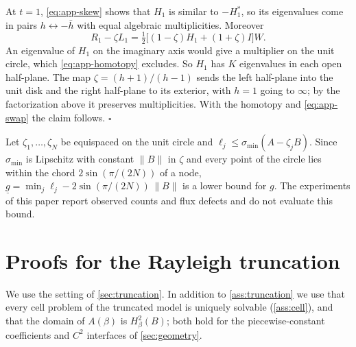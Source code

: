 At $t=1$, \eqref{eq:app-skew} shows that $H_1$ is similar to $-H_1^*$, so its
eigenvalues come in pairs $h\leftrightarrow-\bar h$ with equal algebraic
multiplicities. Moreover
\[
  R_1-\zeta L_1=\tfrac12\bigl[(1-\zeta)H_1+(1+\zeta)I\bigr]W .
\]
An eigenvalue of $H_1$ on the imaginary axis would give a multiplier on the
unit circle, which \eqref{eq:app-homotopy} excludes. So $H_1$ has $K$
eigenvalues in each open half-plane. The map $\zeta=(h+1)/(h-1)$ sends the
left half-plane into the unit disk and the right half-plane to its exterior,
with $h=1$ going to $\infty$; by the factorization above it preserves
multiplicities. With the homotopy and \eqref{eq:app-swap} the claim follows.
\qquad$\square$

\begin{remark}\label{rem:app-gbar}
Let $\zeta_1,\dots,\zeta_N$ be equispaced on the unit circle and
$\ell_j\le\sigma_{\min}(A-\zeta_jB)$. Since $\sigma_{\min}$ is Lipschitz with
constant $\|B\|$ in $\zeta$ and every point of the circle lies within the chord
$2\sin(\pi/(2N))$ of a node,
$\underline g=\min_j\ell_j-2\sin(\pi/(2N))\,\|B\|$ is a lower bound for $g$.
The experiments of this paper report observed counts and flux defects and
do not evaluate this bound.
\end{remark}

\section{Proofs for the Rayleigh truncation}\label{app:root-error}
We use the setting of \cref{sec:truncation}. In addition to
\cref{ass:truncation} we use that every cell problem of the truncated model is
uniquely solvable (\cref{ass:cell}), and that the domain of $A(\beta)$ is
$H^2_\beta(B)$; both hold for the piecewise-constant coefficients and $C^2$
interfaces of \cref{sec:geometry}. 

